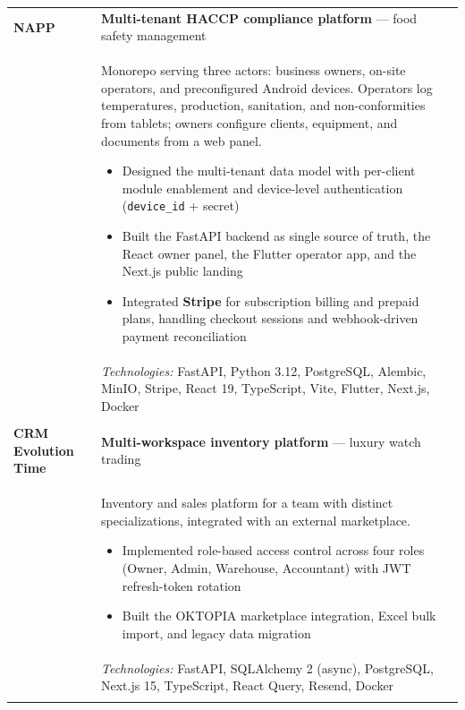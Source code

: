 
\begin{longtable}{C{2.5cm}|p{14.8cm}}

	\textbf{NAPP} & \textbf{Multi-tenant HACCP compliance platform} --- food safety management \hfill \footnotesize{}\\&
	\footnotesize{
		Monorepo serving three actors: business owners, on-site operators, and preconfigured
		Android devices. Operators log temperatures, production, sanitation, and
		non-conformities from tablets; owners configure clients, equipment, and documents from
		a web panel.
		\begin{itemize}
			\item Designed the multi-tenant data model with per-client module enablement and device-level authentication (\texttt{device\_id} + secret)
			\item Built the FastAPI backend as single source of truth, the React owner panel, the Flutter operator app, and the Next.js public landing
			\item Integrated \textbf{Stripe} for subscription billing and prepaid plans, handling checkout sessions and webhook-driven payment reconciliation
		\end{itemize}
		\vspace{-1em}
	}\\&
	\footnotesize{\emph{Technologies:} FastAPI, Python 3.12, PostgreSQL, Alembic, MinIO, Stripe, React 19, TypeScript, Vite, Flutter, Next.js, Docker}\\
\\

	\textbf{CRM Evolution Time} & \textbf{Multi-workspace inventory platform} --- luxury watch trading\\&
	\footnotesize{
		Inventory and sales platform for a team with distinct specializations, integrated with
		an external marketplace.
		\begin{itemize}
			\item Implemented role-based access control across four roles (Owner, Admin, Warehouse, Accountant) with JWT refresh-token rotation
			\item Built the OKTOPIA marketplace integration, Excel bulk import, and legacy data migration
		\end{itemize}
		\vspace{-1em}
	}\\&
	\footnotesize{\emph{Technologies:} FastAPI, SQLAlchemy 2 (async), PostgreSQL, Next.js 15, TypeScript, React Query, Resend, Docker}\\
\\



\end{longtable}
